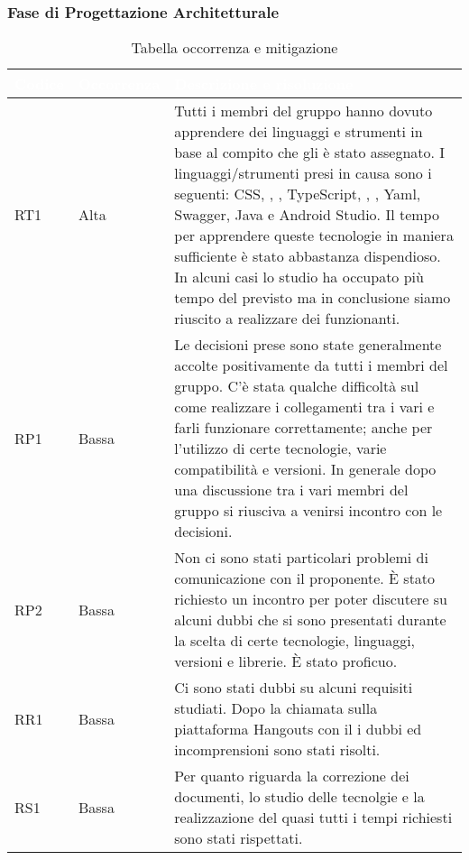 \subsubsection{Fase di Progettazione Architetturale}
{
\renewcommand{\arraystretch}{2}
\centering
\begin{longtable}{C{2cm} C{3cm} C{10cm}}
\caption{Tabella occorrenza e mitigazione}\\

\textcolor{white}{\textbf{Codice}} & 
\textcolor{white}{\textbf{Occorrenza}} & 
\textcolor{white}{\textbf{Descrizione e risoluzione}}\\	
\endhead

RT1 &
Alta &
Tutti i membri del gruppo hanno dovuto apprendere dei linguaggi e strumenti in base al compito che gli è stato assegnato. I linguaggi/strumenti presi in causa sono i seguenti: CSS, , , TypeScript, , , Yaml, Swagger, Java e Android Studio. Il tempo per apprendere queste tecnologie in maniera sufficiente è stato abbastanza dispendioso. In alcuni casi lo studio ha occupato più tempo del previsto ma in conclusione siamo riuscito a realizzare dei  funzionanti. \\

RP1 &
Bassa &
Le decisioni prese sono state generalmente accolte positivamente da tutti i membri del gruppo. C'è stata qualche difficoltà sul come realizzare i collegamenti tra i vari  e farli funzionare correttamente; anche per l'utilizzo di certe tecnologie, varie compatibilità e versioni. In generale dopo una discussione tra i vari membri del gruppo si riusciva a venirsi incontro con le decisioni. \\

RP2 &
Bassa &
Non ci sono stati particolari problemi di comunicazione con il proponente. È stato richiesto un incontro per poter discutere su alcuni dubbi che si sono presentati durante la scelta di certe tecnologie, linguaggi, versioni e librerie. È stato proficuo. \\

RR1 &
Bassa &
Ci sono stati dubbi su alcuni requisiti studiati. Dopo la chiamata sulla piattaforma Hangouts con il \CR{} i dubbi ed incomprensioni sono stati risolti. \\

RS1 &
Bassa &
Per quanto riguarda la correzione dei documenti, lo studio delle tecnolgie e la realizzazione del  quasi tutti i tempi richiesti sono stati rispettati. \\


\end{longtable}}
